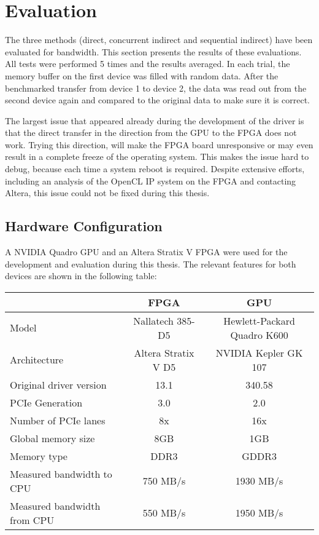 \chapter{Evaluation}
\label{sec:results}

The three methods (direct, concurrent indirect and sequential indirect) have been evaluated for bandwidth.
This section presents the results of these evaluations.
All tests were performed 5 times and the results averaged.
In each trial, the memory buffer on the first device was filled with random data.
After the benchmarked transfer from device 1 to device 2, the data was read out from the second device again and compared to the original data to make sure it is correct.

The largest issue that appeared already during the development of the driver is that the direct transfer in the direction from the GPU to the FPGA does not work.
Trying this direction, will make the FPGA board unresponsive or may even result in a complete freeze of the operating system.
This makes the issue hard to debug, because each time a system reboot is required.
Despite extensive efforts, including an analysis of the OpenCL IP system on the FPGA and contacting Altera, this issue could not be fixed during this thesis.



\section{Hardware Configuration}

A NVIDIA Quadro GPU and an Altera Stratix V FPGA were used for the development and evaluation during this thesis.
The relevant features for both devices are shown in the following table:

\begin{center}
\begin{tabular}{| l | c | c |}
	\hline
	 & FPGA \cite{nallatech385} & GPU \cite{quadrok600}\\
	\hline
	\hline
	Model & Nallatech 385-D5 & Hewlett-Packard Quadro K600\\
	\hline
	Architecture & Altera Stratix V D5 & NVIDIA Kepler GK 107\\
	\hline
	Original driver version & 13.1 & 340.58 \\
	\hline
	PCIe Generation & 3.0  & 2.0 \\
	\hline
	Number of PCIe lanes & 8x  & 16x \\
	\hline
	Global memory size & 8GB  & 1GB \\
	\hline
	Memory type & DDR3  & GDDR3 \\
	\hline
	Measured bandwidth to CPU & 750 MB/s & 1930 MB/s\\
	\hline
	Measured bandwidth from CPU & 550 MB/s & 1950 MB/s\\
	\hline
\end{tabular}
\end{center}




